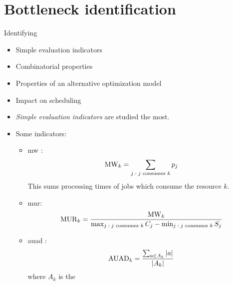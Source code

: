 \section*{Bottleneck identification} \label{sec:related-works/bottleneck-identification}

Identifying 

\begin{itemize}
    \item Simple evaluation indicators
    \item Combinatorial properties
    \item Properties of an alternative optimization model
    \item Impact on scheduling
\end{itemize}

\begin{itemize}
    \item \emph{Simple evaluation indicators} are studied the most.

    \item Some indicators:
    \begin{itemize}
        \item \ac{mw} \citep{}:
            $$
            \operatorname{MW}_{k} = \sum_{j \;:\; \text{$j$ consumes $k$}} p_j
            $$ 
            This sums processing times of jobs which consume the resource $k$.

        \item \ac{mur}:
            $$
            \operatorname{MUR}_{k} = \frac{\operatorname{MW}_{k}}{\max_{j \;:\; \text{$j$ consumes $k$}} C_j - \min_{j \;:\; \text{$j$ consumes $k$}} S_j}
            $$

        \item \ac{auad} \citep{ROSER2001}:
            $$
            \operatorname{AUAD}_{k} = \frac{\sum_{a \in A_k} \left|{a}\right|}{\left|{A_k}\right|}
            $$
            where $A_k$ is the 
    \end{itemize}
\end{itemize}
